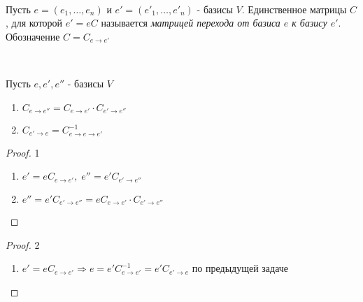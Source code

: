 \bigskip


\begin{definition}~
    
    Пусть $e = \left(e_1, \dots, e_n\right)$ и $e' = \left(e'_1, \dots, e'_n\right)$ - базисы $V$. Единственное матрицы $C$, для которой $e' = e C$ называется \textit{матрицей перехода от базиса $e$ к базису $e'$}. Обозначение $C = C_{e \rightarrow e'}$

    \begin{comment}
    
        При фиксированном базисе в $V$, все базисы в $V$ описываются невырожденными матрицами $n \times n$

    \end{comment}

\end{definition}


\bigskip


\begin{properties}~

    Пусть $e, e', e''$ - базисы $V$
    
    \begin{enumerate}
        \item $C_{e \rightarrow e''} = C_{e \rightarrow e'} \cdot C_{e' \rightarrow e''}$
        \item $C_{e' \rightarrow e} = C^{-1}_{e \rightarrow e \rightarrow e'}$
    \end{enumerate}

    \begin{proof} 1

        \begin{enumerate}
            \item $e' = e C_{e \rightarrow e'}, \; e'' = e' C_{e' \rightarrow e''}$
            \item $e'' = e' C_{e' \rightarrow e''} = e C_{e \rightarrow e'} \cdot C_{e' \rightarrow e''}$
        \end{enumerate}
        
    \end{proof}

    \begin{proof} 2

        \begin{enumerate}
            \item $e' = eC_{e \rightarrow e'} \Rightarrow e = e' C^{-1}_{e \rightarrow e'} = e' C_{e' \rightarrow e}$ по предыдущей задаче
        \end{enumerate}
        
    \end{proof}

\end{properties}


